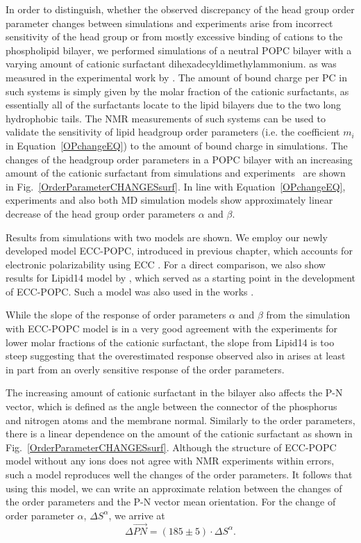 In order to distinguish, whether the observed discrepancy of the head group order parameter changes between simulations and experiments 
arise from incorrect sensitivity of the head group or from mostly excessive binding of cations to the phospholipid bilayer,
we performed simulations of a neutral POPC bilayer with a varying amount of cationic surfactant dihexadecyldimethylammonium. 
as was measured in the experimental work by \citet{scherer89}.
The amount of bound charge per PC 
in such systems is simply given by the molar fraction of the cationic surfactants, 
as essentially all of the surfactants locate to the lipid bilayers 
due to the two long hydrophobic tails.
The NMR measurements of such systems  
can be used to validate the sensitivity of lipid headgroup order parameters 
(i.e. the coefficient $m_i$ in Equation~\ref{OPchangeEQ}) 
to the amount of bound charge in simulations. 
The changes of the headgroup order parameters in a POPC bilayer with an increasing amount of 
the cationic surfactant from simulations and experiments~\citep{scherer89} are shown in Fig.~\ref{OrderParameterCHANGESsurf}.
In line with Equation~\ref{OPchangeEQ},
experiments and also both MD simulation models show approximately linear decrease of the head group order parameters $\alpha$ and $\beta$.

Results from simulations with two models are shown.
We employ our newly developed model ECC-POPC, introduced in previous chapter, 
which accounts for electronic polarizability using ECC \citep{leontyev14}.
For a direct comparison, we also show results for Lipid14 model by \citet{dickson14},
which served as a starting point in the development of ECC-POPC. 
Such a model was also used in the works \citep{catte16, nmrlipids_proj4}. 

While the slope of the response of order parameters $\alpha$ and $\beta$ 
from the simulation with ECC-POPC model 
is in a very good agreement with the experiments for lower molar fractions of the cationic surfactant, 
the slope from Lipid14 is too steep
suggesting that the overestimated response observed also in \citep{catte16}
arises at least in part from an overly sensitive response of the order parameters. 

The increasing amount of cationic surfactant in the bilayer
also affects the P-N vector, 
which is defined as the angle between the connector of the phosphorus and nitrogen atoms and the membrane normal. 
Similarly to the order parameters, 
there is a linear dependence on the amount of the cationic surfactant
as shown in Fig.~\ref{OrderParameterCHANGESsurf}. 
Although the structure of ECC-POPC model without any ions does not agree with NMR experiments within errors,
such a model reproduces well the changes of the order parameters.
It follows that using this model,
we can write an approximate relation between the changes of the order parameters and the P-N vector mean orientation. 
For the change of order parameter $\alpha$, $\Delta S^\alpha$, we arrive at
\begin{equation}
\Delta \vec{PN} = (185 \pm 5) \cdot \Delta S^\alpha .
\end{equation}

